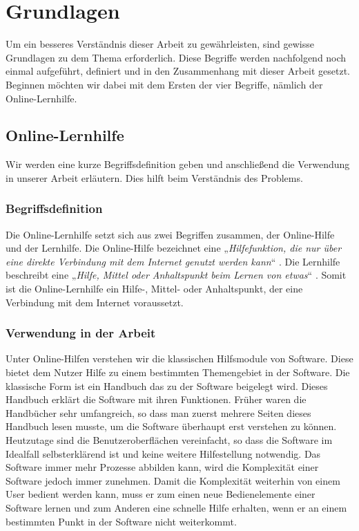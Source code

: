 \chapter{Grundlagen}
Um ein besseres Verständnis dieser Arbeit zu gewährleisten, sind gewisse Grundlagen zu dem Thema erforderlich. Diese Begriffe werden nachfolgend noch einmal aufgeführt, definiert und in den Zusammenhang mit dieser Arbeit gesetzt. Beginnen möchten wir dabei mit dem Ersten der vier Begriffe, nämlich der Online-Lernhilfe.



\section{Online-Lernhilfe}
Wir werden eine kurze Begriffsdefinition geben und anschließend die Verwendung in unserer Arbeit erläutern. Dies hilft beim Verständnis des Problems.
\subsection{Begriffsdefinition}
Die Online-Lernhilfe setzt sich aus zwei Begriffen zusammen, der Online-Hilfe und der Lernhilfe. Die Online-Hilfe bezeichnet eine „\textit{Hilfefunktion, die nur über eine direkte Verbindung mit dem Internet genutzt werden kann}“ \cite{dud1}. Die Lernhilfe beschreibt eine „\textit{Hilfe, Mittel oder Anhaltspunkt beim Lernen von etwas}“ \cite{dud2}. Somit ist die Online-Lernhilfe ein Hilfe-, Mittel- oder Anhaltspunkt, der eine Verbindung mit dem Internet voraussetzt.

\subsection{Verwendung in der Arbeit}
Unter Online-Hilfen verstehen wir die klassischen Hilfsmodule von Software. Diese bietet dem Nutzer Hilfe zu einem bestimmten Themengebiet in der Software. Die klassische Form ist ein Handbuch das zu der Software beigelegt wird. Dieses Handbuch erklärt die Software mit ihren Funktionen. Früher waren die Handbücher sehr umfangreich, so dass man zuerst mehrere Seiten dieses Handbuch lesen musste, um die Software überhaupt erst verstehen zu können. Heutzutage sind die Benutzeroberflächen vereinfacht, so dass die Software im Idealfall selbsterklärend ist und keine weitere Hilfestellung notwendig. Das Software immer mehr Prozesse abbilden kann, wird die Komplexität einer Software jedoch immer zunehmen. Damit die Komplexität weiterhin von einem User bedient werden kann, muss er zum einen neue Bedienelemente einer Software lernen und zum Anderen eine schnelle Hilfe erhalten, wenn er an einem bestimmten Punkt in der Software nicht weiterkommt.

